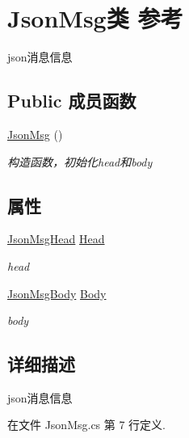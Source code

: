 \hypertarget{class_json_msg}{\section{Json\-Msg类 参考}
\label{class_json_msg}
}


json消息信息  


\subsection*{Public 成员函数}
\begin{DoxyCompactItemize}
\item 
\hyperlink{class_json_msg_a8e07cff4a7b96a2d1e454d409c84b63f}{Json\-Msg} ()
\begin{DoxyCompactList}\small\item\em 构造函数，初始化head和body \end{DoxyCompactList}\end{DoxyCompactItemize}
\subsection*{属性}
\begin{DoxyCompactItemize}
\item 
\hyperlink{class_json_msg_head}{Json\-Msg\-Head} \hyperlink{class_json_msg_a4c8f6abb4969fe20026f3ab370a80b4f}{Head}
\begin{DoxyCompactList}\small\item\em head \end{DoxyCompactList}\item 
\hyperlink{class_json_msg_body}{Json\-Msg\-Body} \hyperlink{class_json_msg_a0f4fea84118d6c732698e80709289cc6}{Body}
\begin{DoxyCompactList}\small\item\em body \end{DoxyCompactList}\end{DoxyCompactItemize}


\subsection{详细描述}
json消息信息 



在文件 Json\-Msg.\-cs 第 7 行定义.



